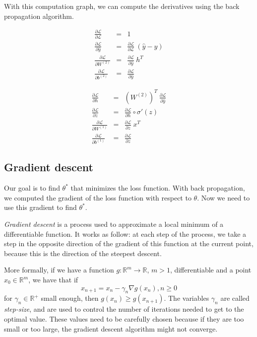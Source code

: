 \documentclass[10pt,a4paper]{article}
\theoremstyle{definition}
\theoremstyle{plain}
\begin{document}
With this computation graph, we can compute the derivatives using the back propagation algorithm.

\begin{multicols}{2}
\begin{eqnarray*}
\frac{\partial \mathcal{L}}{\partial \mathcal{L}} & = & 1 \\
\frac{\partial \mathcal{L}}{\partial \hat{y}} & = & \frac{\partial \mathcal{L}}{\partial \mathcal{L}} \ (\hat{y} - y) \\
\frac{\partial \mathcal{L}}{\partial W^{(2)}} & = & \frac{\partial \mathcal{L}}{\partial \hat{y}}\ h^T \\
\frac{\partial \mathcal{L}}{\partial b^{(2)}} & = & \frac{\partial \mathcal{L}}{\partial \hat{y}}
\end{eqnarray*}

\begin{eqnarray*}
\frac{\partial \mathcal{L}}{\partial h} & = &  (W^{(2)})^T\ \frac{\partial \mathcal{L}}{\partial \hat{y}} \\
\frac{\partial \mathcal{L}}{\partial z} & = & \frac{\partial \mathcal{L}}{\partial h} \circ \sigma '(z) \\
\frac{\partial \mathcal{L}}{\partial W^{(1)}} & = & \frac{\partial \mathcal{L}}{\partial z}\ x^T \\
\frac{\partial \mathcal{L}}{\partial b^{(1)}} & = & \frac{\partial \mathcal{L}}{\partial z} 
\end{eqnarray*}
\end{multicols}

\subsection{Gradient descent}

Our goal is to find $\theta^*$ that minimizes the loss function. With back propagation, we computed the gradient of the loss function with respect to $\theta$. Now we need to use this gradient to find $\theta^*$. 

\textit{Gradient descent} \cite{1} is a process used to approximate a local minimum of a differentiable function. It works as follow: at each step of the process, we take a step in the opposite direction of the gradient of this function at the current point, because this is the direction of the steepest descent.

More formally, if we have a function $g: \mathbb{R}^m \rightarrow \mathbb{R}$, $m>1$, differentiable and a point $x_0\in \mathbb{R}^m$, we have that if
$$
x_{n+1} = x_n -\gamma_n \nabla g(x_n), n\geq 0
$$
for $\gamma_n \in \mathbb{R}^+$ small enough, then $g(x_n) \geq g(x_{n+1})$. The variables $\gamma_n$ are called \textit{step-size}, and are used to control the number of iterations needed to get to the optimal value. These values need to be carefully chosen because if they are too small or too large, the gradient descent algorithm might not converge.
\end{document}
